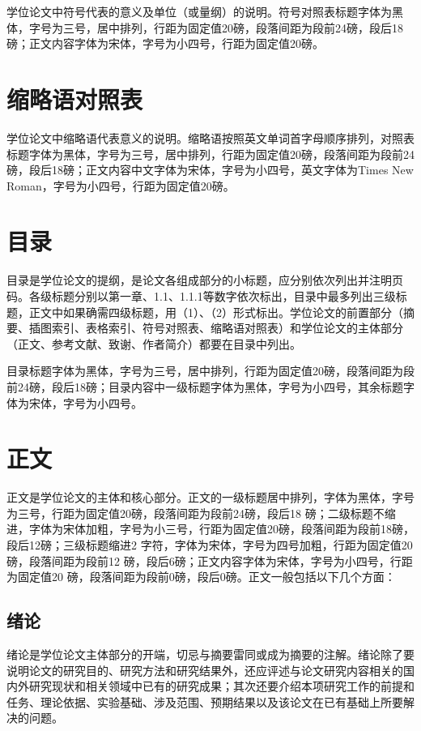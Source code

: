 学位论文中符号代表的意义及单位（或量纲）的说明。符号对照表标题字体为黑体，字号为三号，居中排列，行距为固定值20磅，段落间距为段前24磅，段后18磅；正文内容字体为宋体，字号为小四号，行距为固定值20磅。

\section{缩略语对照表}

学位论文中缩略语代表意义的说明。缩略语按照英文单词首字母顺序排列，对照表标题字体为黑体，字号为三号，居中排列，行距为固定值20磅，段落间距为段前24磅，段后18磅；正文内容中文字体为宋体，字号为小四号，英文字体为Times New Roman，字号为小四号，行距为固定值20磅。

\section{目录}

目录是学位论文的提纲，是论文各组成部分的小标题，应分别依次列出并注明页码。各级标题分别以第一章、1.1、1.1.1等数字依次标出，目录中最多列出三级标题，正文中如果确需四级标题，用（1）、（2）形式标出。学位论文的前置部分（摘要、插图索引、表格索引、符号对照表、缩略语对照表）和学位论文的主体部分（正文、参考文献、致谢、作者简介）都要在目录中列出。

目录标题字体为黑体，字号为三号，居中排列，行距为固定值20磅，段落间距为段前24磅，段后18磅；目录内容中一级标题字体为黑体，字号为小四号，其余标题字体为宋体，字号为小四号。

\section{正文}

正文是学位论文的主体和核心部分。正文的一级标题居中排列，字体为黑体，字号为三号，行距为固定值20磅，段落间距为段前24磅，段后18 磅；二级标题不缩进，字体为宋体加粗，字号为小三号，行距为固定值20磅，段落间距为段前18磅，段后12磅；三级标题缩进2 字符，字体为宋体，字号为四号加粗，行距为固定值20磅，段落间距为段前12 磅，段后6磅；正文内容字体为宋体，字号为小四号，行距为固定值20 磅，段落间距为段前0磅，段后0磅。正文一般包括以下几个方面：

\subsection{绪论}

绪论是学位论文主体部分的开端，切忌与摘要雷同或成为摘要的注解。绪论除了要说明论文的研究目的、研究方法和研究结果外，还应评述与论文研究内容相关的国内外研究现状和相关领域中已有的研究成果；其次还要介绍本项研究工作的前提和任务、理论依据、实验基础、涉及范围、预期结果以及该论文在已有基础上所要解决的问题。


